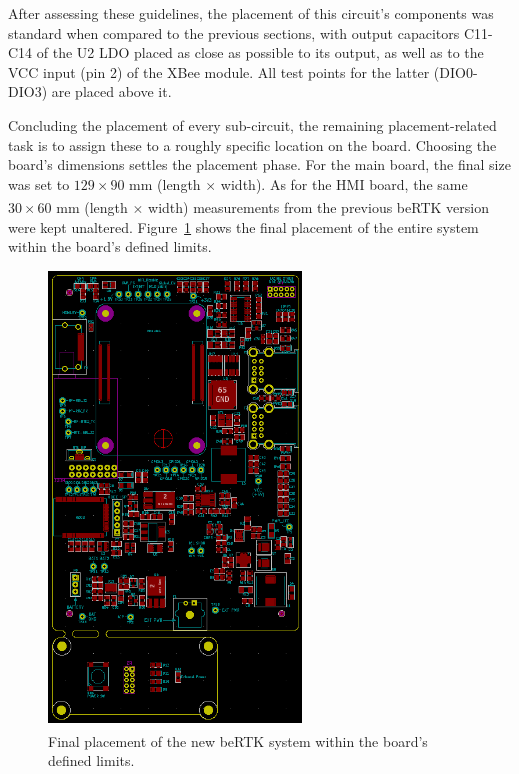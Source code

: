 After assessing these guidelines, the placement of this circuit's components was standard when compared to the previous sections, with output capacitors C11-C14 of the U2 LDO placed as close as possible to its output, as well as to the VCC input (pin 2) of the XBee module. All test points for the latter (DIO0-DIO3) are placed above it.


Concluding the placement of every sub-circuit, the remaining placement-related task is to assign these to a roughly specific location on the board. Choosing the board's dimensions settles the placement phase. For the main board, the final size was set to $129 \times 90$ mm (length $\times$ width). As for the HMI board, the same $30 \times 60$ mm (length $\times$ width) measurements from the previous beRTK\textsuperscript{\textregistered} version were kept unaltered. Figure~\ref{fig:placement_FULL} shows the final placement of the entire system within the board's defined limits.

\begin{figure}[h]
	\centering
	\includegraphics[width=0.6\textwidth]{Chapters/Figures/chapter5/placement_FULL.png}
	\caption{Final placement of the new beRTK\textsuperscript{\textregistered} system within the board's defined limits.}
	\label{fig:placement_FULL}
\end{figure}%

